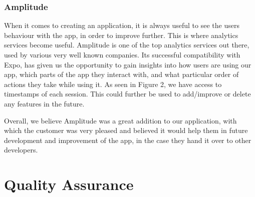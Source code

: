 \documentclass{l3proj}
\begin{document}
\subsubsection{Amplitude}
When it comes to creating an application, it is always useful to see the users behaviour with the app, in order to improve further. This is where analytics services become useful. Amplitude\cite{WEBSITE:amplitude} is one of the top analytics services out there, used by various very well known companies. Its successful compatibility with Expo, has given us the opportunity to gain insights into how users are using our app, which parts of the app they interact with, and what particular order of actions they take while using it. As seen in Figure 2, we have access to timestamps of each session. This could further be used to add/improve or delete any features in the future.\par
Overall, we believe Amplitude was a great addition to our application, with which the customer was very pleased and believed it would help them in future development and improvement of the app, in the case they hand it over to other developers.\par
\section{Quality Assurance}
\label{sec: quality assurance}
\end{document}
